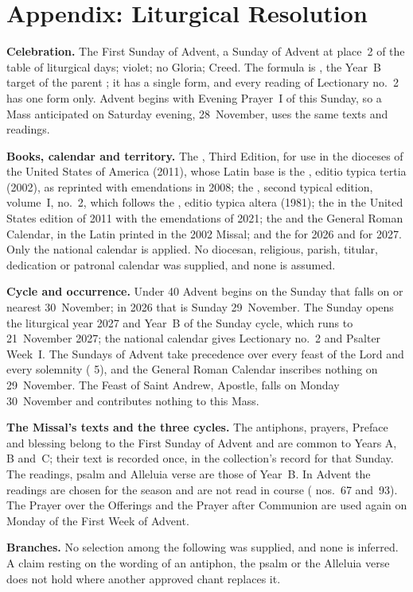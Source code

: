 \clearpage
\section{Appendix: Liturgical Resolution}
\label{sec:liturgical-resolution}

{\small
\textbf{Celebration.} The First Sunday of Advent, a Sunday of Advent at
place~2 of the table of liturgical days; violet; no Gloria; Creed. The formula
is , the Year~B target of the parent ; it has a
single form, and every reading of Lectionary no.~2 has one form only. Advent
begins with Evening Prayer~I of this Sunday, so a Mass anticipated on Saturday
evening, 28~November, uses the same texts and readings.

\textbf{Books, calendar and territory.} The , Third
Edition, for use in the dioceses of the United States of America (2011), whose
Latin base is the , editio typica tertia (2002), as
reprinted with emendations in 2008; the , second typical edition,
volume~I, no.~2, which follows the , editio typica
altera (1981); the  in the
United States edition of 2011 with the emendations of 2021; the
 and the General
Roman Calendar, in the Latin printed in the 2002 Missal; and the
 for
2026 and for 2027. Only the national calendar is applied. No diocesan,
religious, parish, titular, dedication or patronal calendar was supplied, and
none is assumed.

\textbf{Cycle and occurrence.} Under  40 Advent begins
on the Sunday that falls on or nearest 30~November; in 2026 that is Sunday
29~November. The Sunday opens the liturgical year 2027 and Year~B of the
Sunday cycle, which runs to 21~November 2027; the national calendar gives
Lectionary no.~2 and Psalter Week~I. The Sundays of Advent take precedence
over every feast of the Lord and every solemnity ( 5),
and the General Roman Calendar inscribes nothing on 29~November. The Feast of
Saint Andrew, Apostle, falls on Monday 30~November and contributes nothing
to this Mass.

\textbf{The Missal's texts and the three cycles.} The antiphons, prayers,
Preface and blessing belong to the First Sunday of Advent and are common to
Years A, B and~C; their text is recorded once, in the collection's record for
that Sunday. The readings, psalm and Alleluia verse are those of Year~B. In
Advent the readings are chosen for the season and are not read in course
( nos.~67 and~93). The Prayer over the Offerings and the
Prayer after Communion are used again on Monday of the First Week of Advent.

\textbf{Branches.} No selection among the following was supplied, and none is
inferred. A claim resting on the wording of an antiphon, the psalm or the
Alleluia verse does not hold where another approved chant replaces it.
\par}

